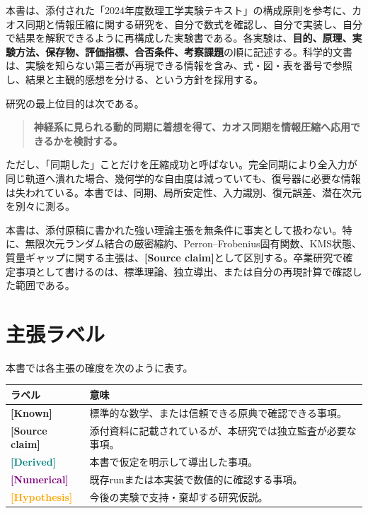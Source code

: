 \documentclass[a4paper,11pt,oneside,openany]{ltjsbook}
\newcommand{\Known}{\textcolor{Forest}{\sffamily\bfseries [Known]}}
\newcommand{\SourceClaim}{\textcolor{Brick}{\sffamily\bfseries [Source claim]}}
\newcommand{\Derived}{\textcolor{Teal}{\sffamily\bfseries [Derived]}}
\newcommand{\Numerical}{\textcolor{Purple}{\sffamily\bfseries [Numerical]}}
\newcommand{\Hypothesis}{\textcolor{Orange}{\sffamily\bfseries [Hypothesis]}}
\begin{document}
本書は、添付された「2024年度数理工学実験テキスト」の構成原則を参考に、カオス同期と情報圧縮に関する研究を、自分で数式を確認し、自分で実装し、自分で結果を解釈できるように再構成した実験書である。各実験は、\textbf{目的、原理、実験方法、保存物、評価指標、合否条件、考察課題}の順に記述する。科学的文書は、実験を知らない第三者が再現できる情報を含み、式・図・表を番号で参照し、結果と主観的感想を分ける、という方針を採用する\cite{mathlab2024}。

研究の最上位目的は次である。

\begin{quote}
\textbf{神経系に見られる動的同期に着想を得て、カオス同期を情報圧縮へ応用できるかを検討する。}
\end{quote}

ただし、「同期した」ことだけを圧縮成功と呼ばない。完全同期により全入力が同じ軌道へ潰れた場合、幾何学的な自由度は減っていても、復号器に必要な情報は失われている。本書では、同期、局所安定性、入力識別、復元誤差、潜在次元を別々に測る。

\begin{cautionbox}
本書は、添付原稿に書かれた強い理論主張を無条件に事実として扱わない。特に、無限次元ランダム結合の厳密縮約、Perron--Frobenius固有関数、KMS状態、質量ギャップに関する主張は、\SourceClaim として区別する。卒業研究で確定事項として書けるのは、標準理論、独立導出、または自分の再現計算で確認した範囲である。
\end{cautionbox}

\section*{主張ラベル}
本書では各主張の確度を次のように表す。

\begin{longtable}{p{32mm}p{112mm}}
\toprule
ラベル & 意味 \\
\midrule
\Known & 標準的な数学、または信頼できる原典で確認できる事項。\\
\SourceClaim & 添付資料に記載されているが、本研究では独立監査が必要な事項。\\
\Derived & 本書で仮定を明示して導出した事項。\\
\Numerical & 既存runまたは本実装で数値的に確認する事項。\\
\Hypothesis & 今後の実験で支持・棄却する研究仮説。\\
\bottomrule
\end{longtable}
\end{document}
